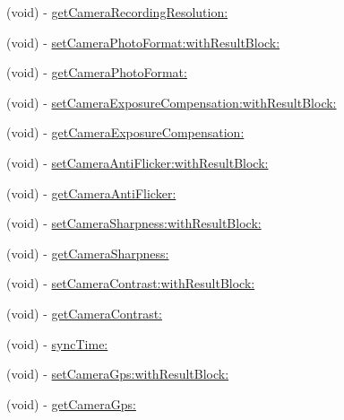 \begin{DoxyCompactItemize}
\item 
(void) -\/ \hyperlink{category_d_j_i_camera_07_camera_settings_08_abf7a4e534fca76520b6b7723b267b33c}{get\+Camera\+Recording\+Resolution\+:}
\item 
(void) -\/ \hyperlink{category_d_j_i_camera_07_camera_settings_08_a866646cab142e602d5c41074c7931b26}{set\+Camera\+Photo\+Format\+:with\+Result\+Block\+:}
\item 
(void) -\/ \hyperlink{category_d_j_i_camera_07_camera_settings_08_aacb8e2260944d9bc5d02840dbd98952f}{get\+Camera\+Photo\+Format\+:}
\item 
(void) -\/ \hyperlink{category_d_j_i_camera_07_camera_settings_08_a6755ae71cfba5edd7ead0132d2e8b32a}{set\+Camera\+Exposure\+Compensation\+:with\+Result\+Block\+:}
\item 
(void) -\/ \hyperlink{category_d_j_i_camera_07_camera_settings_08_a8ac02ef272b0748ae0b9ba0606cf1ff5}{get\+Camera\+Exposure\+Compensation\+:}
\item 
(void) -\/ \hyperlink{category_d_j_i_camera_07_camera_settings_08_a6de121d0c2f5380a3f981ab58fd3d039}{set\+Camera\+Anti\+Flicker\+:with\+Result\+Block\+:}
\item 
(void) -\/ \hyperlink{category_d_j_i_camera_07_camera_settings_08_a8a10b5f222f52ab4a567f9daaa66c01b}{get\+Camera\+Anti\+Flicker\+:}
\item 
(void) -\/ \hyperlink{category_d_j_i_camera_07_camera_settings_08_a3e12cf84035bd62ed1ed0c8b631744b0}{set\+Camera\+Sharpness\+:with\+Result\+Block\+:}
\item 
(void) -\/ \hyperlink{category_d_j_i_camera_07_camera_settings_08_ac66a941aa97f5759b6edbeed63ed2651}{get\+Camera\+Sharpness\+:}
\item 
(void) -\/ \hyperlink{category_d_j_i_camera_07_camera_settings_08_a0f6dc6fba1427b888eef36be70d3a66b}{set\+Camera\+Contrast\+:with\+Result\+Block\+:}
\item 
(void) -\/ \hyperlink{category_d_j_i_camera_07_camera_settings_08_a808873449e7ee9d0cd934717c8da5d56}{get\+Camera\+Contrast\+:}
\item 
(void) -\/ \hyperlink{category_d_j_i_camera_07_camera_settings_08_a859dae115d90d5a76b9bb20ff7472ad3}{sync\+Time\+:}
\item 
(void) -\/ \hyperlink{category_d_j_i_camera_07_camera_settings_08_ab82f5dd8ff7436ff1854e87b8d98dd32}{set\+Camera\+Gps\+:with\+Result\+Block\+:}
\item 
(void) -\/ \hyperlink{category_d_j_i_camera_07_camera_settings_08_a12ea90b2078c79e442b737367f174d69}{get\+Camera\+Gps\+:}

\end{DoxyCompactItemize}
